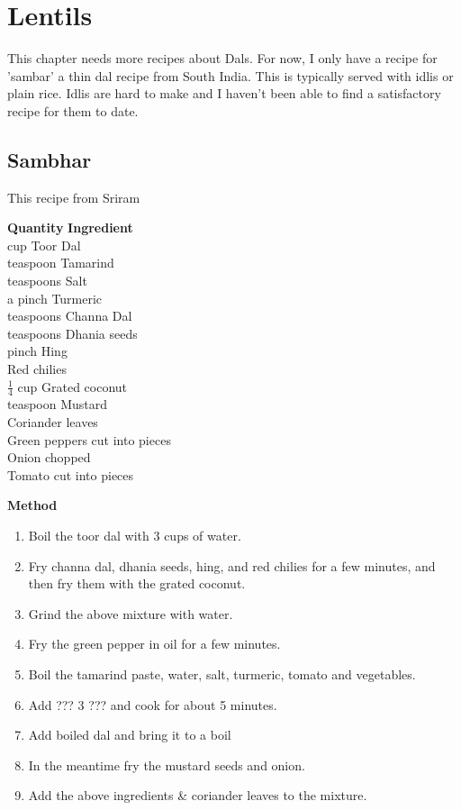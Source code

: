 \chapter{Lentils}
  This chapter needs more recipes about Dals.  For now, I only have a
recipe for 
'sambar' a thin dal recipe from South India.  This  is  typically  served  with
idlis  or plain rice.  Idlis are hard to make and I haven't been able to find a
satisfactory recipe for them to date.

\section{Sambhar}
  This recipe from Sriram


\begin{tabbing}
\hspace{1.0cm}  \={\bf Quantity}   \hspace{3.0cm} \={\bf Ingredient}\\
  cup   \>Toor Dal\\
  teaspoon   \>Tamarind\\
  teaspoons   \>Salt\\
 \>a pinch   \>Turmeric\\
  teaspoons   \>Channa Dal\\
  teaspoons   \>Dhania seeds\\
  pinch   \>Hing\\
    \>Red chilies\\
 \>$\frac{1}{4}$ cup   \>Grated coconut \\
  teaspoon   \>Mustard\\
  \>Coriander leaves\\
     \>Green peppers cut into pieces\\
     \>Onion chopped\\
     \>Tomato cut into pieces\\
\end{tabbing}

{\bf Method}
\begin{enumerate}
   \item Boil the toor dal with 3 cups of water.
   \item Fry channa dal, dhania seeds, hing, and red chilies for a few  minutes,
      and then fry them with the grated coconut.
   \item Grind the above mixture with water.
   \item Fry the green pepper in oil for a few minutes.
   \item Boil the tamarind paste, water, salt, turmeric, tomato and vegetables.
   \item Add ??? 3 ??? and cook for about 5 minutes.
   \item Add boiled dal and bring it to a boil
   \item In the meantime fry the mustard seeds and onion.
   \item Add the above ingredients \& coriander leaves to the mixture.
\end{enumerate}


